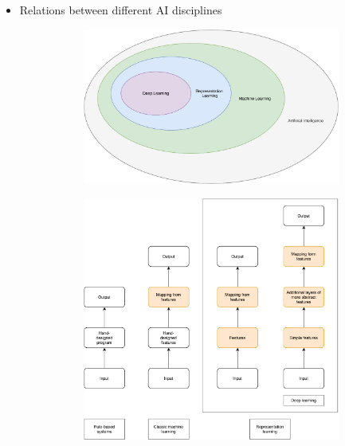 \documentclass[t]{beamer}
\begin{document}
\begin{frame}
    \begin{itemize}
        \item Relations between different AI disciplines
        \begin{figure}
            \begin{minipage}{0.45\textwidth}
                \begin{figure}[]
                    \centering
                    \includegraphics[width=\textwidth]{../plots/ai-venn.pdf}
                \end{figure}
            \end{minipage}\hfill
            \begin{minipage}{0.45\textwidth}
                \begin{figure}[]
                    \centering
                    \includegraphics[width=\textwidth]{../plots/ai-flowchart.pdf}

\end{figure}
\end{minipage}
\end{figure}
\end{itemize}
\end{frame}
\end{document}
